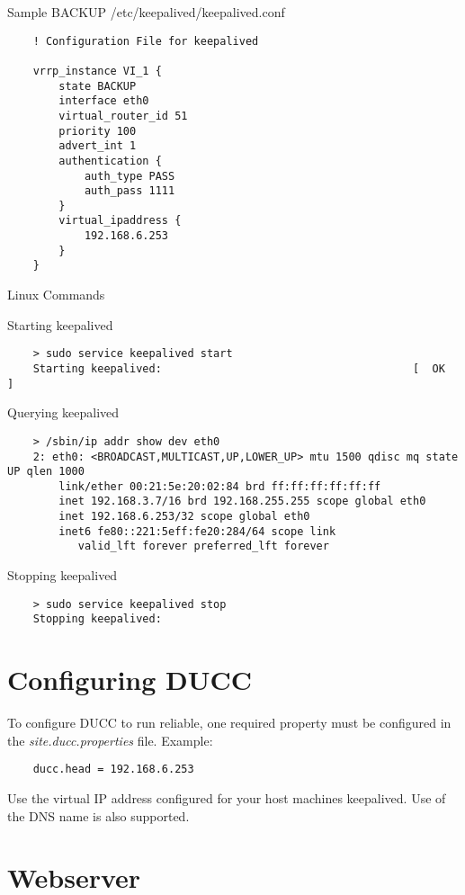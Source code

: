 	Sample BACKUP /etc/keepalived/keepalived.conf
	
	\begin{verbatim}
    ! Configuration File for keepalived

	vrrp_instance VI_1 {
	    state BACKUP
	    interface eth0
	    virtual_router_id 51
	    priority 100
	    advert_int 1
	    authentication {
	        auth_type PASS
	        auth_pass 1111
	    }
	    virtual_ipaddress {
	        192.168.6.253
	    }
	}
   	\end{verbatim}
   	
	Linux Commands
	
	Starting keepalived
	
    \begin{verbatim}
    > sudo service keepalived start
    Starting keepalived:                                       [  OK  ]
   	\end{verbatim}
   	
   	Querying keepalived
	
    \begin{verbatim}
    > /sbin/ip addr show dev eth0
	2: eth0: <BROADCAST,MULTICAST,UP,LOWER_UP> mtu 1500 qdisc mq state UP qlen 1000
	    link/ether 00:21:5e:20:02:84 brd ff:ff:ff:ff:ff:ff
	    inet 192.168.3.7/16 brd 192.168.255.255 scope global eth0
	    inet 192.168.6.253/32 scope global eth0
	    inet6 fe80::221:5eff:fe20:284/64 scope link 
	       valid_lft forever preferred_lft forever
   	\end{verbatim}

	Stopping keepalived
	
    \begin{verbatim}
    > sudo service keepalived stop
    Stopping keepalived: 
   	\end{verbatim}

\section{Configuring DUCC}  
    To configure DUCC to run reliable, one required property must
    be configured in the {\em site.ducc.properties} file.  Example:
    
    \begin{verbatim}
	ducc.head = 192.168.6.253
   	\end{verbatim}
    
    Use the virtual IP address configured for your host machines keepalived. 
    Use of the DNS name is also supported. 
    
\section{Webserver}

